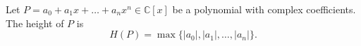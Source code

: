 \documentclass[12pt]{article}
\begin{document}
Let $P = a_0 + a_1x + \ldots + a_nx^n \in \mathbb{C}[x]$ be a polynomial with complex coefficients. The height of $P$ is
\begin{displaymath}
H(P) = \operatorname{max}\{\mid a_0 \mid ,\mid a_1 \mid , \ldots , \mid a_n \mid\}.
\end{displaymath}
\end{document}
